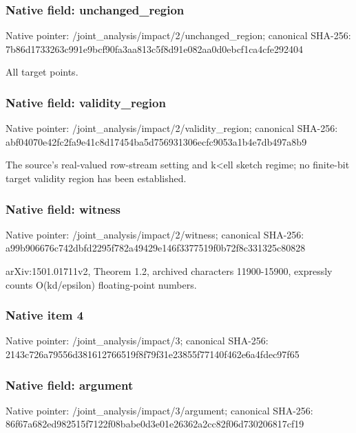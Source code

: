 \documentclass[10pt,a4paper]{article}
\begin{document}
\subsubsection{Native field: unchanged\_\allowbreak{}region}
Native pointer: /joint\_\allowbreak{}analysis/impact/2/unchanged\_\allowbreak{}region; canonical SHA-256: 7b86d1733263c991e9bcf90fa3aa813c5f8d91e082aa0d0ebcf1ca4cfe292404

\begingroup\raggedright\sloppy All target points.\par\endgroup

\subsubsection{Native field: validity\_\allowbreak{}region}
Native pointer: /joint\_\allowbreak{}analysis/impact/2/validity\_\allowbreak{}region; canonical SHA-256: abf04070e42fc2fa9e41c8d17454ba5d756931306ecfc9053a1b4e7db497a8b9

\begingroup\raggedright\sloppy The source's real-valued row-stream setting and k<ell sketch regime;\allowbreak{} no finite-bit target validity region has been established.\par\endgroup

\subsubsection{Native field: witness}
Native pointer: /joint\_\allowbreak{}analysis/impact/2/witness; canonical SHA-256: a99b906676c742dbfd2295f782a49429e146f3377519f0b72f8c331325c80828

\begingroup\raggedright\sloppy arXiv:\allowbreak{}1501.01711v2,\allowbreak{} Theorem 1.2,\allowbreak{} archived characters 11900-15900,\allowbreak{} expressly counts O(kd/\allowbreak{}epsilon) floating-point numbers.\par\endgroup

\subsubsection{Native item 4}
Native pointer: /joint\_\allowbreak{}analysis/impact/3; canonical SHA-256: 2143c726a79556d381612766519f8f79f31e23855f77140f462e6a4fdec97f65

\subsubsection{Native field: argument}
Native pointer: /joint\_\allowbreak{}analysis/impact/3/argument; canonical SHA-256: 86f67a682ed982515f7122f08babe0d3e01e26362a2cc82f06d730206817cf19
\end{document}

